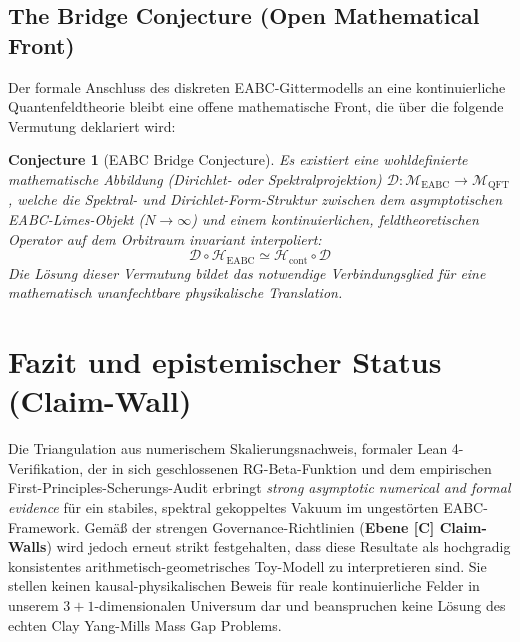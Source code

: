 \documentclass[11pt,a4paper]{article}
\newtheorem{conjecture}{Conjecture}
\begin{document}
	\subsection{The Bridge Conjecture (Open Mathematical Front)}
	Der formale Anschluss des diskreten EABC-Gittermodells an eine kontinuierliche Quantenfeldtheorie bleibt eine offene mathematische Front, die über die folgende Vermutung deklariert wird:
	\begin{conjecture}[EABC Bridge Conjecture]
		Es existiert eine wohldefinierte mathematische Abbildung (Dirichlet- oder Spektralprojektion) $\mathcal{D}: \mathcal{M}_{\text{EABC}} \to \mathcal{M}_{\text{QFT}}$, welche die Spektral- und Dirichlet-Form-Struktur zwischen dem asymptotischen EABC-Limes-Objekt ($N \to \infty$) und einem kontinuierlichen, feldtheoretischen Operator auf dem Orbitraum invariant interpoliert:
		\begin{equation}
			\mathcal{D} \circ \mathcal{H}_{\text{EABC}} \simeq \mathcal{H}_{\text{cont}} \circ \mathcal{D}
		\end{equation}
		Die Lösung dieser Vermutung bildet das notwendige Verbindungsglied für eine mathematisch unanfechtbare physikalische Translation.
	\end{conjecture}
	
	\section{Fazit und epistemischer Status (Claim-Wall)}
	Die Triangulation aus numerischem Skalierungsnachweis, formaler Lean 4-Verifikation, der in sich geschlossenen RG-Beta-Funktion und dem empirischen First-Principles-Scherungs-Audit erbringt \textit{strong asymptotic numerical and formal evidence} für ein stabiles, spektral gekoppeltes Vakuum im ungestörten EABC-Framework. Gemäß der strengen Governance-Richtlinien (\textbf{Ebene [C] Claim-Walls}) wird jedoch erneut strikt festgehalten, dass diese Resultate als hochgradig konsistentes arithmetisch-geometrisches Toy-Modell zu interpretieren sind. Sie stellen keinen kausal-physikalischen Beweis für reale kontinuierliche Felder in unserem $3+1$-dimensionalen Universum dar und beanspruchen keine Lösung des echten Clay Yang-Mills Mass Gap Problems.
	
\end{document}
